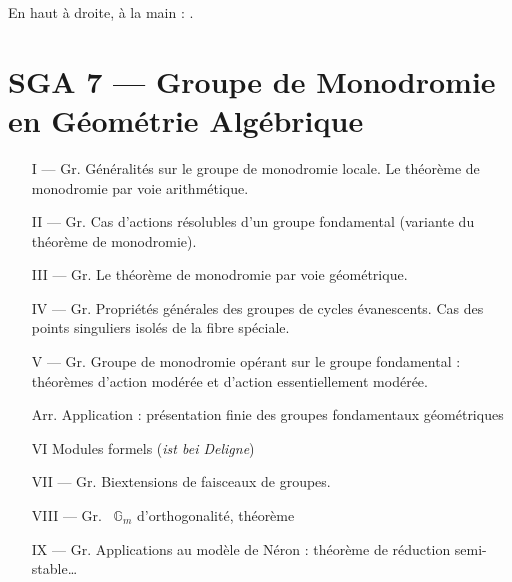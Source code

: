 \documentclass[11pt,a4paper]{article}
\begin{document}

En haut à droite, à la main : .

\section*{SGA 7 --- Groupe de Monodromie en Géométrie Algébrique}


\begin{itemize}
\item[I --- Gr.] Généralités sur le groupe de monodromie locale. Le théorème de
monodromie par voie arithmétique.

\item[II --- Gr.] Cas d'actions résolubles d'un groupe fondamental (variante du
 théorème de monodromie).

\item[III --- Gr.] Le théorème de monodromie par voie géométrique.

\item[IV --- Gr.] Propriétés générales des groupes de cycles évanescents. Cas
des points singuliers isolés de la fibre spéciale.

\item[V --- Gr.] Groupe de monodromie opérant sur le groupe fondamental :
théorèmes d'action modérée et d'action essentiellement modérée.

\item[\struck{VI} Arr.] Application : présentation finie des groupes
fondamentaux géométriques

\item[VI]  Modules formels (\emph{ist bei Deligne})

\item[VII --- Gr.] Biextensions de faisceaux de groupes.

\item[VIII --- Gr.] 
\ill\ $\mathbb{G}_{m}$ d'orthogonalité, théorème

\item[IX --- Gr.] Applications au modèle de Néron : \struck{\ill} théorème de
réduction semi-stable…

\item[\struck{X}] 
\end{itemize}
\end{document}
